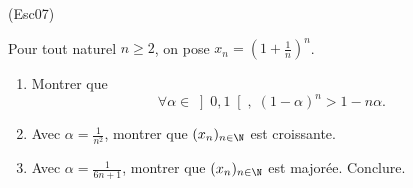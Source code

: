\begin{tiny}(Esc07)\end{tiny} Pour tout naturel $n\geq 2$, on pose $x_{n}=\left( 1+\frac{1}{n}\right) ^{n}$.

\begin{enumerate}
  \item  Montrer que
\[
\forall \alpha \in \left] 0,1\right[, \;(1-\alpha)^{n} > 1 - n\alpha.
\]

  \item Avec $\alpha =\frac{1}{n^{2}}$, montrer que $(x_{n})_{n\in \N}$ est croissante.

  \item Avec $\alpha =\frac{1}{6n+1}$, montrer que $(x_{n})_{n\in \N}$ est major{\'e}e. Conclure.
\end{enumerate}
